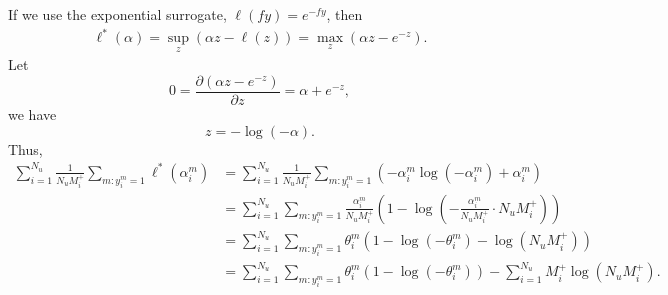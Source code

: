 If we use the exponential surrogate, \ie $\ell(fy) = e^{-fy}$, then
\begin{equation*}
\begin{aligned}
\ell^*(\alpha) = \sup_z (\alpha z - \ell(z) ) = \max_z (\alpha z - e^{-z}).
\end{aligned}
\end{equation*}
Let 
\begin{equation*}
0 = \frac{\partial (\alpha z - e^{-z})} {\partial z} = \alpha + e^{-z},
\end{equation*}
we have 
\begin{equation*}
z = -\log(-\alpha).
\end{equation*}
Thus, 
\begin{equation*}
\begin{aligned}
\sum_{i = 1}^{N_u} \frac{1}{N_u M_i^+} \sum_{m: y_i^m = 1} \ell^*(\alpha_i^m)
&= \sum_{i = 1}^{N_u} \frac{1}{N_u M_i^+} \sum_{m: y_i^m = 1} \left( -\alpha_i^m \log(-\alpha_i^m) + \alpha_i^m \right) \\
&= \sum_{i = 1}^{N_u} \sum_{m: y_i^m = 1} \frac{\alpha_i^m}{N_u M_i^+} \left(1 - \log \left( -\frac{\alpha_i^m}{N_u M_i^+} 
   \cdot N_u M_i^+ \right) \right) \\
&= \sum_{i = 1}^{N_u} \sum_{m: y_i^m = 1} \theta_i^m \left( 1 - \log(-\theta_i^m) - \log(N_u M_i^+) \right) \\
&= \sum_{i = 1}^{N_u} \sum_{m: y_i^m = 1} \theta_i^m \left( 1 - \log(-\theta_i^m) \right) - \sum_{i=1}^{N_u} M_i^+ \log(N_u M_i^+).
\end{aligned}
\end{equation*}
